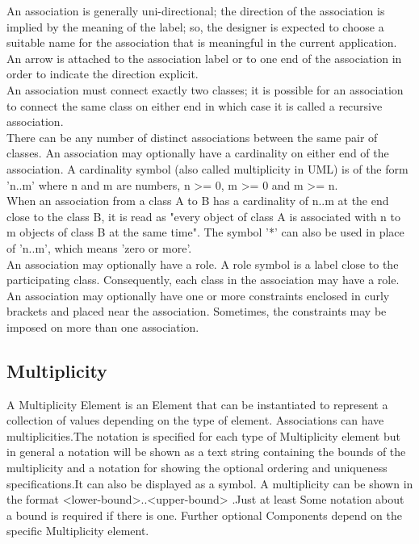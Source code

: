 { An association is generally uni-directional; the direction of the association is implied by the meaning of the label; so, the designer is expected to choose a suitable name for the association that is meaningful in the current application.\\
 
 An arrow is attached to the association label or to one end of the association in order to indicate the direction explicit.\\
 
 An association must connect exactly two classes; it is possible for an association to connect the same class on either end in which case it is called a recursive association.\\
 
  There can be any number of distinct associations between the same pair of classes. An association may optionally have a cardinality on either end of the association. A cardinality symbol (also called multiplicity in UML) is of the form 'n..m' where n and m are numbers, n >= 0, m >= 0 and m >= n.\\
  
  When an association from a class A to B has a cardinality of n..m at the end close to the class B, it is read as "every object of class A is associated with n to m objects of class B at the same time". The symbol '*' can also be used in place of 'n..m', which means 'zero or more'.\\
  
  An association may optionally have a role. A role symbol is a label close to the participating class. Consequently, each class in the association may have a role.\\
  An association may optionally have one or more constraints enclosed in curly brackets and placed near the association. Sometimes, the constraints may be imposed on more than one association. 
\subsection{Multiplicity}
A Multiplicity Element is an Element that can be instantiated to represent a collection of values depending on the type of element. Associations can have multiplicities.The notation is specified for each type of Multiplicity element but in general a notation will be shown as a text string containing the bounds of the multiplicity and a notation for showing the optional ordering and uniqueness specifications.It can also be displayed as a symbol. A multiplicity can be shown in the format <lower-bound>..<upper-bound> .Just at least Some notation about a bound is required if there is one. Further optional Components depend on the specific Multiplicity element.
}
